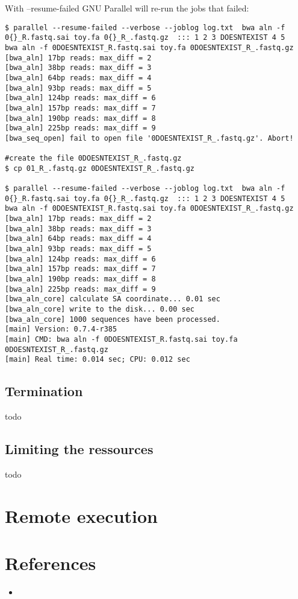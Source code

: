 \documentclass{article}
\begin{document}
With --resume-failed GNU Parallel will re-run the jobs that failed:
\begin{lstlisting}
$ parallel --resume-failed --verbose --joblog log.txt  bwa aln -f 0{}_R.fastq.sai toy.fa 0{}_R_.fastq.gz  ::: 1 2 3 DOESNTEXIST 4 5
bwa aln -f 0DOESNTEXIST_R.fastq.sai toy.fa 0DOESNTEXIST_R_.fastq.gz
[bwa_aln] 17bp reads: max_diff = 2
[bwa_aln] 38bp reads: max_diff = 3
[bwa_aln] 64bp reads: max_diff = 4
[bwa_aln] 93bp reads: max_diff = 5
[bwa_aln] 124bp reads: max_diff = 6
[bwa_aln] 157bp reads: max_diff = 7
[bwa_aln] 190bp reads: max_diff = 8
[bwa_aln] 225bp reads: max_diff = 9
[bwa_seq_open] fail to open file '0DOESNTEXIST_R_.fastq.gz'. Abort!

#create the file 0DOESNTEXIST_R_.fastq.gz 
$ cp 01_R_.fastq.gz 0DOESNTEXIST_R_.fastq.gz

$ parallel --resume-failed --verbose --joblog log.txt  bwa aln -f 0{}_R.fastq.sai toy.fa 0{}_R_.fastq.gz  ::: 1 2 3 DOESNTEXIST 4 5
bwa aln -f 0DOESNTEXIST_R.fastq.sai toy.fa 0DOESNTEXIST_R_.fastq.gz
[bwa_aln] 17bp reads: max_diff = 2
[bwa_aln] 38bp reads: max_diff = 3
[bwa_aln] 64bp reads: max_diff = 4
[bwa_aln] 93bp reads: max_diff = 5
[bwa_aln] 124bp reads: max_diff = 6
[bwa_aln] 157bp reads: max_diff = 7
[bwa_aln] 190bp reads: max_diff = 8
[bwa_aln] 225bp reads: max_diff = 9
[bwa_aln_core] calculate SA coordinate... 0.01 sec
[bwa_aln_core] write to the disk... 0.00 sec
[bwa_aln_core] 1000 sequences have been processed.
[main] Version: 0.7.4-r385
[main] CMD: bwa aln -f 0DOESNTEXIST_R.fastq.sai toy.fa 0DOESNTEXIST_R_.fastq.gz
[main] Real time: 0.014 sec; CPU: 0.012 sec
\end{lstlisting}
\subsection{Termination}
todo

\subsection{Limiting the ressources}
todo

\section{Remote execution}



\section{References}
\begin{itemize}
\item{}
\end{itemize}
\end{document}
